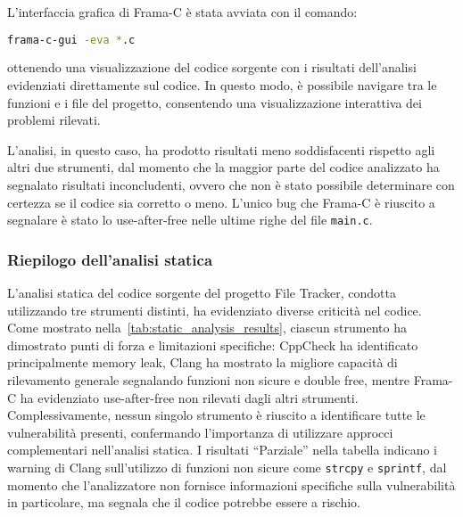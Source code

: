 L'interfaccia grafica di Frama-C è stata avviata con il comando: \begin{lstlisting}[language=bash, numbers=none]
frama-c-gui -eva *.c
\end{lstlisting}
ottenendo una visualizzazione del codice sorgente con i risultati dell'analisi evidenziati
direttamente sul codice. In questo modo, è possibile navigare tra le funzioni e i
file del progetto, consentendo una visualizzazione interattiva dei problemi
rilevati.

L'analisi, in questo caso, ha prodotto risultati meno soddisfacenti rispetto
agli altri due strumenti, dal momento che la maggior parte del codice analizzato
ha segnalato risultati inconcludenti, ovvero che non è stato possibile
determinare con certezza se il codice sia corretto o meno. L'unico bug che Frama-C
è riuscito a segnalare è stato lo use-after-free nelle ultime righe del file \texttt{main.c}.

\subsubsection*{Riepilogo dell'analisi statica}
L'analisi statica del codice sorgente del progetto File Tracker, condotta utilizzando
tre strumenti distinti, ha evidenziato diverse criticità nel codice. Come mostrato
nella~\autoref{tab:static_analysis_results}, ciascun strumento ha dimostrato
punti di forza e limitazioni specifiche: CppCheck ha identificato principalmente
memory leak, Clang ha mostrato la migliore capacità di rilevamento generale
segnalando funzioni non sicure e double free, mentre Frama-C ha evidenziato use-after-free
non rilevati dagli altri strumenti. Complessivamente, nessun singolo strumento è
riuscito a identificare tutte le vulnerabilità presenti, confermando l'importanza
di utilizzare approcci complementari nell'analisi statica. I risultati ``Parziale''
nella tabella indicano i warning di Clang sull'utilizzo di funzioni non sicure come
\texttt{strcpy} e \texttt{sprintf}, dal momento che l'analizzatore non fornisce
informazioni specifiche sulla vulnerabilità in particolare, ma segnala che il codice
potrebbe essere a rischio.

